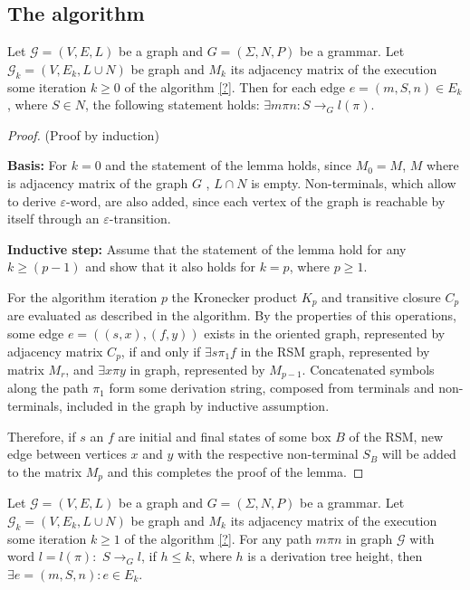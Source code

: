 \subsection{The algorithm}

\begin{lemma}
    Let $\mathcal{G} = (V,E,L)$ be a graph and $G = (\Sigma, N, P)$ be a grammar.
    Let $\mathcal{G}_k = (V,E_k,L \cup N)$ be graph and $M_k$ its adjacency
    matrix of the execution some iteration $k \geq 0$ of the algorithm \ref{?}.
    Then for each edge $e = (m,S,n) \in E_k$, where $S \in N$,
    the following statement holds: $\exists m\pi n: S \to_{G} l(\pi)$.
\end{lemma}

\begin{proof}{(Proof by induction)}

    \textbf{Basis:} For $k = 0$ and the statement of the lemma holds, since
    $M_0 = M$, $M$ where is adjacency matrix of the graph $G$ , $L \cap N$
    is empty. Non-terminals, which allow to derive $\varepsilon$-word, are also added,
    since each vertex of the graph is reachable by itself through an
    $\varepsilon$-transition.
    
    \textbf{Inductive step:} Assume that the statement of the lemma hold for any
    $k \geq (p - 1)$ and show that it also holds for $k = p$, where $p \geq 1$.
    
    For the algorithm iteration $p$ the Kronecker product $K_p$ and transitive
    closure $C_p$ are evaluated as described in the algorithm. By the properties
    of this operations, some edge $e = ((s,x),(f,y))$ exists in the oriented
    graph, represented by adjacency matrix $C_p$, if and only if $\exists s
    \pi_1 f$ in the RSM graph, represented by matrix $M_r$, and $\exists x \pi y$
    in graph, represented by $M_{p-1}$. Concatenated symbols along the path
    $\pi_1$ form some derivation string, composed from terminals and
    non-terminals, included in the graph by inductive assumption. 
    
    Therefore, if $s$ an $f$ are initial and final states of some box $B$ of the
    RSM, new edge between vertices $x$ and $y$ with the respective non-terminal
    $S_B$ will be added to the matrix $M_p$ and this completes the proof of the
    lemma.
    
\end{proof}

\begin{lemma}
    Let $\mathcal{G} = (V,E,L)$ be a graph and  $G = (\Sigma, N, P)$ be a grammar. 
    Let $\mathcal{G}_k = (V,E_k,L \cup N)$ be graph and $M_k$ its adjacency
    matrix of the execution some iteration $k \geq 1$ of the algorithm \ref{?}. 
    For any path $m \pi n$ in graph $\mathcal{G}$ with word
    $l = l(\pi): $ $S \to_G l$, if $h \leq k$, where $h$ is a derivation 
    tree height, then $\exists e = (m,S,n): e \in E_k$.
\end{lemma}


